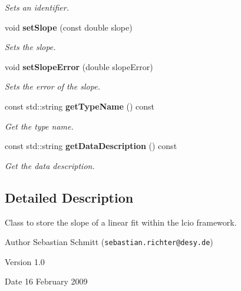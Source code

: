 \begin{DoxyCompactItemize}
\begin{DoxyCompactList}\small\item\em Sets an identifier. \item\end{DoxyCompactList}\item 
void {\bf setSlope} (const double slope)\label{classCALICE_1_1LinearFitSlope_a0d35587b2fb909e93cc04391b6167e37}

\begin{DoxyCompactList}\small\item\em Sets the slope. \item\end{DoxyCompactList}\item 
void {\bf setSlopeError} (double slopeError)\label{classCALICE_1_1LinearFitSlope_a7ded89ec05a1418e1ee13a83b87d8b47}

\begin{DoxyCompactList}\small\item\em Sets the error of the slope. \item\end{DoxyCompactList}\item 
const std::string {\bf getTypeName} () const 
\begin{DoxyCompactList}\small\item\em Get the type name. \item\end{DoxyCompactList}\item 
const std::string {\bf getDataDescription} () const 
\begin{DoxyCompactList}\small\item\em Get the data description. \item\end{DoxyCompactList}\end{DoxyCompactItemize}


\subsection{Detailed Description}
Class to store the slope of a linear fit within the lcio framework. \begin{DoxyAuthor}{Author}
Sebastian Schmitt ({\tt sebastian.richter@desy.de}) 
\end{DoxyAuthor}
\begin{DoxyVersion}{Version}
1.0 
\end{DoxyVersion}
\begin{DoxyDate}{Date}
16 February 2009 
\end{DoxyDate}


